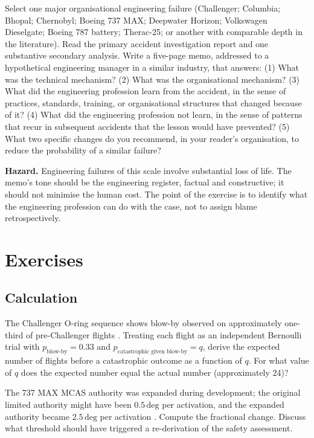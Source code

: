 \begin{project}
Select one major organisational engineering failure (Challenger; Columbia; Bhopal; Chernobyl; Boeing 737 MAX; Deepwater Horizon; Volkswagen Dieselgate; Boeing 787 battery; Therac-25; or another with comparable depth in the literature). Read the primary accident investigation report and one substantive secondary analysis. Write a five-page memo, addressed to a hypothetical engineering manager in a similar industry, that answers: (1) What was the technical mechanism? (2) What was the organisational mechanism? (3) What did the engineering profession learn from the accident, in the sense of practices, standards, training, or organisational structures that changed because of it? (4) What did the engineering profession not learn, in the sense of patterns that recur in subsequent accidents that the lesson would have prevented? (5) What two specific changes do you recommend, in your reader's organisation, to reduce the probability of a similar failure?

\textbf{Hazard.} Engineering failures of this scale involve substantial loss of life. The memo's tone should be the engineering register, factual and constructive; it should not minimise the human cost. The point of the exercise is to identify what the engineering profession can do with the case, not to assign blame retrospectively.
\end{project}

\section{Exercises}

\subsection*{Calculation}

\begin{exercise}
The Challenger O-ring sequence shows blow-by observed on approximately one-third of pre-Challenger flights \cite{acc:nasa-challenger}. Treating each flight as an independent Bernoulli trial with $p_{\text{blow-by}} = 0.33$ and $p_{\text{catastrophic given blow-by}} = q$, derive the expected number of flights before a catastrophic outcome as a function of $q$. For what value of $q$ does the expected number equal the actual number (approximately 24)?
\end{exercise}

\begin{exercise}
The 737 MAX MCAS authority was expanded during development; the original limited authority might have been $0.5\,\text{deg}$ per activation, and the expanded authority became $2.5\,\text{deg}$ per activation \cite{acc:house-737max-2020}. Compute the fractional change. Discuss what threshold should have triggered a re-derivation of the safety assessment.
\end{exercise}

